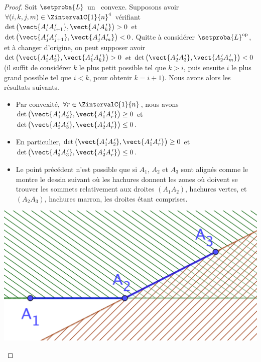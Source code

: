 \begin{proof}
    Soit $\setproba{L}$ un \ncycle\ convexe. 
    Supposons avoir $\forall (i, k, j, m) \in \ZintervalC{1}{n}^4$ vérifiant
    $\det \big( \vect{A^{\,\prime}_i A^{\,\prime}_{i+1}}, \vect{A^{\,\prime}_i A^{\,\prime}_k} \big) > 0$
    et
    $\det \big( \vect{A^{\,\prime}_j A^{\,\prime}_{j+1}}, \vect{A^{\,\prime}_j A^{\,\prime}_m} \big) < 0$.
    Quitte à considérer $\setproba{L}^{\mathrm{op}}$, et à changer d'origine, on peut supposer avoir 
    $\det \big( \vect{A^{\,\prime}_1 A^{\,\prime}_2}, \vect{A^{\,\prime}_1 A^{\,\prime}_k} \big) > 0$
    et
    $\det \big( \vect{A^{\,\prime}_2 A^{\,\prime}_3}, \vect{A^{\,\prime}_2 A^{\,\prime}_m} \big) < 0$
    (il suffit de considérer $k$ le plus petit possible tel que $k > i$, puis ensuite $i$ le plus grand possible tel que $i < k$, pour obtenir $k = i+1$). Nous avons alors les résultats suivants.
	\begin{itemize}
		\item Par convexité, 
        $\forall r \in \ZintervalC{1}{n}$,
        nous avons
        $\det \big( \vect{A^{\,\prime}_1 A^{\,\prime}_2}, \vect{A^{\,\prime}_1 A^{\,\prime}_r} \big) \geq 0$
        et
        $\det \big( \vect{A^{\,\prime}_2 A^{\,\prime}_3}, \vect{A^{\,\prime}_2 A^{\,\prime}_r} \big) \leq 0$.


		\item En particulier,
        $\det \big( \vect{A^{\,\prime}_1 A^{\,\prime}_2}, \vect{A^{\,\prime}_1 A^{\,\prime}_r} \big) \geq 0$
        et
        $\det \big( \vect{A^{\,\prime}_2 A^{\,\prime}_3}, \vect{A^{\,\prime}_2 A^{\,\prime}_r} \big) \leq 0$.


		\item Le point précédent n'est possible que si $A_1$, $A_2$ et $A_3$ sont alignés comme le montre le dessin suivant où les hachures donnent les zones où doivent se trouver les sommets relativement aux droites $(A_1 A_2)$, hachures vertes, et $(A_2 A_3)$, hachures marron, les droites étant comprises.
    \end{itemize}
    
    \begin{center}
        \includegraphics[scale=.5]{content/polygon/at-least-one/conv-det-sign.png}
    \end{center}



\end{proof}
